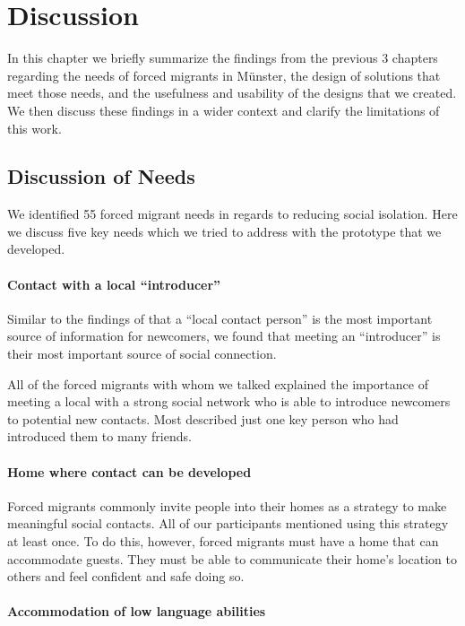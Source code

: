 \chapter{Discussion}
\label{cha:discussion}

In this chapter we briefly summarize the findings from the previous 3 chapters regarding the needs of forced migrants in Münster, the design of solutions that meet those needs, and the usefulness and usability of the designs that we created. We then discuss these findings in a wider context and clarify the limitations of this work.


\section{Discussion of Needs}

We identified 55 forced migrant needs in regards to reducing social isolation. Here we discuss five key needs which we tried to address with the prototype that we developed.

\subsubsection*{Contact with a local ``introducer''}

Similar to the findings of  that a ``local contact person'' is the most important source of information for newcomers, we found that meeting an ``introducer'' is their most important source of social connection.

All of the forced migrants with whom we talked explained the importance of meeting a local with a strong social network who is able to introduce newcomers to potential new contacts. Most described just one key person who had introduced them to many friends.

\subsubsection*{Home where contact can be developed}

Forced migrants commonly invite people into their homes as a strategy to make meaningful social contacts. All of our participants mentioned using this strategy at least once. To do this, however, forced migrants must have a home that can accommodate guests. They must be able to communicate their home's location to others and feel confident and safe doing so.

\subsubsection*{Accommodation of low language abilities}


